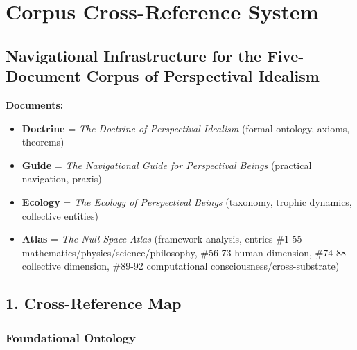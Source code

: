 \section*{Corpus Cross-Reference System}


\subsection*{Navigational Infrastructure for the Five-Document Corpus of Perspectival Idealism}


\textbf{Documents:}

\begin{itemize}[nosep,leftmargin=*]
  \item \textbf{Doctrine} = \textit{The Doctrine of Perspectival Idealism} (formal ontology, axioms, theorems)
  \item \textbf{Guide} = \textit{The Navigational Guide for Perspectival Beings} (practical navigation, praxis)
  \item \textbf{Ecology} = \textit{The Ecology of Perspectival Beings} (taxonomy, trophic dynamics, collective entities)
  \item \textbf{Atlas} = \textit{The Null Space Atlas} (framework analysis, entries \#1-55 mathematics/\allowbreak physics/\allowbreak science/\allowbreak philosophy, \#56-73 human dimension, \#74-88 collective dimension, \#89-92 computational consciousness/\allowbreak cross-substrate)
\end{itemize}


\bigskip\noindent\makebox[\textwidth]{\color{rulegray}\rule{5cm}{0.3pt}}\bigskip


\subsection*{1. Cross-Reference Map}


\subsubsection*{Foundational Ontology}



